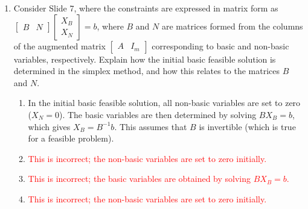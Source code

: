 \documentclass{article}%
\newcommand{\incorrect}[1]{\textcolor{red}{#1}}
\begin{document}
\begin{enumerate}
\begin{enumerate}%
\item \incorrect{This is only true at the optimal solution, according to strong duality.}%
\item The primal objective function value ($c_B^T B^{-1} b$) is the negative of the dual objective function value ($-c_B^T B^{-1} b$). This reflects the fundamental relationship in duality: the optimal objective function values of the primal and dual problems are equal (but opposite in sign if one is maximization and the other is minimization).%
\item \incorrect{The relationship is not simply a transpose; it involves a negative sign.}%
\item \incorrect{There is a fundamental relationship between the primal and dual objective function values, based on duality theory.}%
\item \incorrect{This is only true for feasible solutions before reaching optimality (weak duality).}%
\end{enumerate}%
\vspace{1em}%
\item Consider Slide 7, where the constraints are expressed in matrix form as $\begin{bmatrix} B & N \end{bmatrix} \begin{bmatrix} X_B \\ X_N \end{bmatrix} = b$, where $B$ and $N$ are matrices formed from the columns of the augmented matrix $\begin{bmatrix} A & I_m \end{bmatrix}$ corresponding to basic and non-basic variables, respectively.  Explain how the initial basic feasible solution is determined in the simplex method, and how this relates to the matrices $B$ and $N$.%
\begin{enumerate}%
\item In the initial basic feasible solution, all non-basic variables are set to zero ($X_N = 0$).  The basic variables are then determined by solving $BX_B = b$, which gives $X_B = B^{-1}b$.  This assumes that $B$ is invertible (which is true for a feasible problem).%
\item \incorrect{This is incorrect; the non-basic variables are set to zero initially.}%
\item \incorrect{This is incorrect; the basic variables are obtained by solving $BX_B = b$.}%
\item \incorrect{This is incorrect; the non-basic variables are set to zero initially.}%

\end{enumerate}
\end{enumerate}
\end{document}
